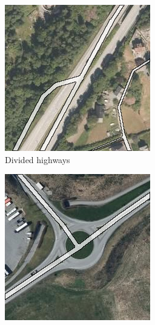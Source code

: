 \begin{figure}[h]
\begin{subfigure}{0.31\textwidth}
\includegraphics[width=\linewidth]{figs/datasets/nor_examples/1191_highway_n50.png}
\caption{Divided highways} \label{fig:norwegian_roads_highway_n50}
\end{subfigure}
\hspace*{\fill} %
\begin{subfigure}{0.31\textwidth}
\includegraphics[width=\linewidth]{figs/datasets/nor_examples/1177_roundabout_n50.png}

\end{subfigure}
\end{figure}
